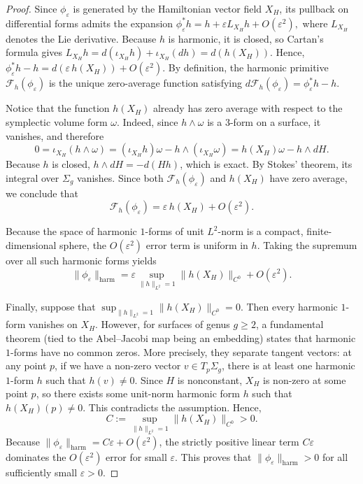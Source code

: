 \documentclass[11pt]{article}
\theoremstyle{definition}
\begin{document}
	\begin{proof}
		Since $\phi_\varepsilon$ is generated by the Hamiltonian vector field $X_H$, its
		pullback on differential forms admits the expansion $\phi_\varepsilon^*h = h +
		\varepsilon L_{X_H}h + O(\varepsilon^2),$ where $L_{X_H}$ denotes the Lie
		derivative. Because $h$ is harmonic, it is closed, so Cartan's formula gives
		$L_{X_H}h = d(\iota_{X_H}h) + \iota_{X_H}(dh) = d(h(X_H)).$ Hence,
		$\phi_\varepsilon^*h-h = d(\varepsilon\,h(X_H)) + O(\varepsilon^2).$ By
		definition, the harmonic primitive $\mathcal F_h(\phi_\varepsilon)$ is the
		unique zero-average function satisfying $d\mathcal F_h(\phi_\varepsilon) =
		\phi_\varepsilon^*h-h.$
		
		Notice that the function $h(X_H)$ already has zero average with respect to the
		symplectic volume form $\omega$. Indeed, since $h \wedge \omega$ is a $3$-form
		on a surface, it vanishes, and therefore
		\[
		0 = \iota_{X_H}(h \wedge \omega) = (\iota_{X_H}h)\omega - h \wedge
		(\iota_{X_H}\omega) = h(X_H)\omega - h \wedge dH.
		\]
		Because $h$ is closed, $h \wedge dH = -d(Hh)$, which is exact. By Stokes'
		theorem, its integral over $\Sigma_g$ vanishes. Since both $\mathcal
		F_h(\phi_\varepsilon)$ and $h(X_H)$ have zero average, we conclude that
		\[
		\mathcal F_h(\phi_\varepsilon)
		=
		\varepsilon\,h(X_H)
		+
		O(\varepsilon^2).
		\]
		
		Because the space of harmonic $1$-forms of unit $L^2$-norm is a compact,
		finite-dimensional sphere, the $O(\varepsilon^2)$ error term is uniform in $h$.
		Taking the supremum over all such harmonic forms yields
		\[
		\|\phi_\varepsilon\|_{\mathrm{harm}}
		=
		\varepsilon
		\sup_{\|h\|_{L^2}=1}
		\|h(X_H)\|_{C^0}
		+
		O(\varepsilon^2).
		\]
		
		Finally, suppose that $\sup_{\|h\|_{L^2}=1}\|h(X_H)\|_{C^0}=0.$ Then every
		harmonic $1$-form vanishes on $X_H$. However, for surfaces of genus $g \ge 2$, a
		fundamental theorem (tied to the Abel--Jacobi map being an embedding) states
		that harmonic $1$-forms have no common zeros. More precisely, they separate
		tangent vectors: at any point $p$, if we have a non-zero vector $v \in
		T_p\Sigma_g$, there is at least one harmonic $1$-form $h$ such that $h(v) \neq
		0$. Since $H$ is nonconstant, $X_H$ is non-zero at some point $p$, so there
		exists some unit-norm harmonic form $h$ such that $h(X_H)(p) \neq 0$. This
		contradicts the assumption. Hence, 
		\[
		C := \sup_{\|h\|_{L^2}=1}\|h(X_H)\|_{C^0}>0.
		\]
		Because $\|\phi_\varepsilon\|_{\mathrm{harm}} = C\varepsilon + O(\varepsilon^2)$,
		the strictly positive linear term $C\varepsilon$ dominates the $O(\varepsilon^2)$
		error for small $\varepsilon$. This proves that $\|\phi_\varepsilon\|_{\mathrm{harm}}>0$
		for all sufficiently small $\varepsilon>0$.
	\end{proof}
	
\end{document}
